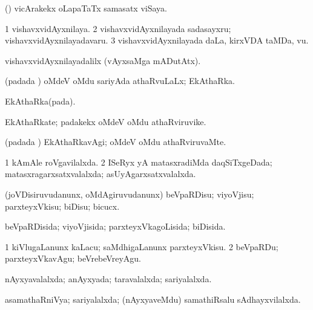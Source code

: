 \noindent
\gl{\pagu}
\expl{}
\bmng
{} (\takaR) vicArakekx oLapaTaTx samasatx viSaya. 
\emng
\eentry

\bentry
{} 
\gl{\nA}
\bmng
\bnum
\num{1} vishavxvidAyxnilaya. 
\num{2} vishavxvidAyxnilayada sadasayxru; vishavxvidAyxnilayadavaru. 
\num{3} vishavxvidAyxnilayada daLa, kirxVDA taMDa, \mo vu. 
\enum
\emng

\noindent 
\gl{\pagu}
\expl{}
\bmng
{} vishavxvidAyxnilayadalilx (vAyxsaMga mADutAtx). 
\emng
\eentry

\bentry
{} 
\gl{\gu}
\expl{}
\bmng
(padada \vi) oMdeV oMdu sariyAda athaRvuLaLx; EkAthaRka. 
\emng
\eentry

\bentry
{} 
\gl{\nA}
\expl{}
\bmng
EkAthaRka(pada). 
\emng
\eentry

\bentry
{} 
\gl{\nA}
\expl{}
\bmng
EkAthaRkate; padakekx oMdeV oMdu athaRviruvike. 
\emng
\eentry

\bentry
{} 
\gl{\kirxvi}
\expl{}
\bmng
(padada \vi) EkAthaRkavAgi; oMdeV oMdu athaRviruvaMte. 
\emng
\eentry

\bentry
{} 
\gl{\gu}
\expl{}
\bmng
\bnum
\num{1} kAmAle roVgavilalxda. 
\num{2} ISeRyx yA matasxradiMda daqSiTxgeDada; matasxragarxsatxvalalxda; asUyAgarxsatxvalalxda. 
\enum
\emng
\eentry

\bentry
{} 
\gl{\sakirx}
\expl{}
\bmng
(joVDisiruvudanunx, oMdAgiruvudanunx) beVpaRDisu; viyoVjisu; parxteyxVkisu; biDisu; bicucx. 
\emng
\eentry

\bentry
{} 
\gl{\gu}
\expl{}
\bmng
beVpaRDisida; viyoVjisida; parxteyxVkagoLisida; biDisida. 
\emng
\eentry

\bentry
{} 
\gl{\sakirx}
\expl{}
\bmng
\bnum
\num{1} kiVlugaLanunx kaLacu; saMdhigaLanunx parxteyxVkisu. 
\num{2} beVpaRDu; parxteyxVkavAgu; beVrebeVreyAgu. 
\enum
\emng
\eentry

\bentry
{} 
\gl{\gu}
\expl{}
\bmng
nAyxyavalalxda; anAyxyada; taravalalxda; sariyalalxda. 
\emng
\eentry

\bentry
{} 
\gl{\gu}
\expl{}
\bmng
asamathaRniVya; sariyalalxda; (nAyxyaveMdu) samathiRsalu sAdhayxvilalxda. 
\emng
\eentry

